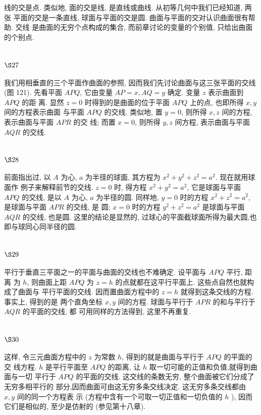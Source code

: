 线的交是点. 类似地, 面的交是线, 是直线或曲线. 从初等几何中我们已经知道, 两张 平面的交是一条直线, 球面与平面的交是圆. 曲面与平面的交对认识曲面很有帮助. 交线 是曲面的无穷个点构成的集合, 而前章讨论的变量的个别值, 只给出曲面的个别点.

\section{$\S 27$}

我们用相垂直的三个平面作曲面的参照, 因而我们先讨论曲面与这三张平面的交线 (图 121). 先看平面 $A P Q$, 它由变量 $A P=x, A Q=y$ 确定. 变量 $z$ 表示曲面到 $A P Q$ 的距 离. 显然 $z=0$ 时得到的是曲面的位于平面 $A P Q$ 上的点, 也即所得 $x, y$ 间的方程表示曲面 与平面 $A P Q$ 的交线. 类似地, 置 $y=0$, 则所得 $x, z$ 间的方程, 表示曲面与平面 $A P R$ 的交 线; 而置 $x=0$, 则所得 $y, z$ 间方程, 表示曲面与平面 $A Q R$ 的交线.

\section{$\S 28$}

前面指出过, 以 $A$ 为心, $a$ 为半径的球面, 其方程为 $x^{2}+y^{2}+z^{2}=a^{2}$. 现在就用球面作 例子来解释前节的交线. $z=0$ 时, 得方程 $x^{2}+y^{2}=a^{2}$, 它是球面与平面 $A P Q$ 的交线, 是以 $A$ 为心, $a$ 为半径的圆. 同样地, $y=0$ 时的方程 $x^{2}+z^{2}=a^{2}$, 是球面与平面 $A P R$ 的交线, 是 圆; $x=0$ 时的方程 $y^{2}+z^{2}=a^{2}$ 是球面与平面 $A Q R$ 的交线, 也是圆. 这里的结论是显然的, 过球心的平面截球面所得为最大圆,也即与球同心同半径的圆.

\section{$\S 29$}

平行于垂直三平面之一的平面与曲面的交线也不难确定. 设平面与 $A P Q$ 平行, 距离 为 $h$, 则曲面上距 $A P Q$ 为 $z=h$ 的点就都在这平行平面上. 这些点自然也就构成了曲面与 平行平面的交线. 因而置曲面方程中的 $z=h$ 就得到这条交线的方程. 事实上, 得到的是 两个直角坐标 $x, y$ 间的方程. 球面与平行于 $A P R$ 的和与平行于 $A Q R$ 的平面的交线, 都 可用同样的方法得到, 这里不再重复. 

\section{$\S 30$}

这样, 令三元曲面方程中的 $z$ 为常数 $h$, 得到的就是曲面与平行于 $A P Q$ 的平面的交 线方程. $h$ 是平行平面至 $A P Q$ 的距离, 让 $h$ 取一切可能的正值和负值,就得到曲面与一切 平行于 $A P Q$ 的平面的交线. 这交线的条数无穷, 整个曲面被它们分成了无穷多相平行的 部分,因而曲面可由这无穷多条交线决定. 这无穷多条交线都由 $x, y$ 间的同一个方程表 示 (方程中含有一个可取一切正值和一切负值的 $h$ ), 因而它们是相似的, 至少是仿射的 (参见第十八章).

